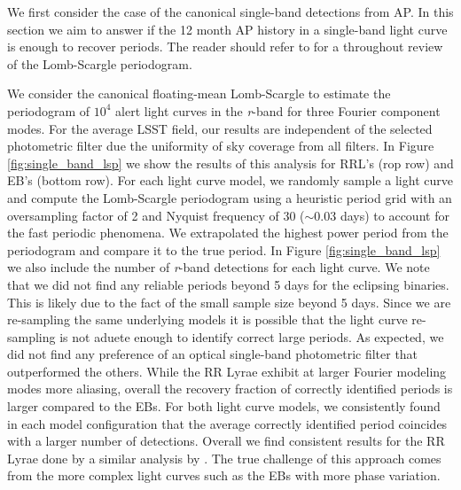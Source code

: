 \documentclass[DM,authoryear,toc]{lsstdoc}
\begin{document}
We first consider the case of the canonical single-band detections from AP. In this section we aim to answer  if the 12 month AP history in a single-band light curve is enough to recover periods. The reader should refer to \citet{VanderPlas:VP2015} for a throughout review of the Lomb-Scargle periodogram.   

We consider the canonical floating-mean Lomb-Scargle to estimate the periodogram of $10^4$ alert light curves in the \textit{r}-band for three Fourier component modes. For the average LSST field, our results are independent of the selected photometric filter due the uniformity of sky coverage from all filters. In Figure \ref{fig:single_band_lsp} we show the results of this analysis for RRL's (rop row) and EB's (bottom row). For each light curve model, we randomly sample a light curve and compute the Lomb-Scargle periodogram using a heuristic period grid with an oversampling factor of 2 and Nyquist frequency of 30 ($\sim$0.03 days) to account for the fast periodic phenomena. We extrapolated the highest power period from the periodogram and compare it to the true period. In Figure \ref{fig:single_band_lsp} we also include the number of \textit{r}-band detections for each light curve. We note that we did not find any reliable periods beyond 5 days for the eclipsing binaries. This is likely due to the fact of the small sample size beyond 5 days. Since we are re-sampling the same underlying models it is possible that the light curve re-sampling is not aduete enough to identify correct large periods. As expected, we did not find any preference of an optical single-band photometric filter that outperformed the others. While the RR Lyrae exhibit at larger Fourier modeling modes more aliasing, overall the recovery fraction of correctly identified periods is larger compared to the EBs. For both light curve models, we consistently found in each model configuration that the average correctly identified period coincides with a larger number of detections. Overall we find consistent results for the RR Lyrae done by a similar analysis by \citet{VanderPlas:VP2015}. The true challenge of this approach comes from the more complex light curves such as the EBs with more phase variation. 
\end{document}
